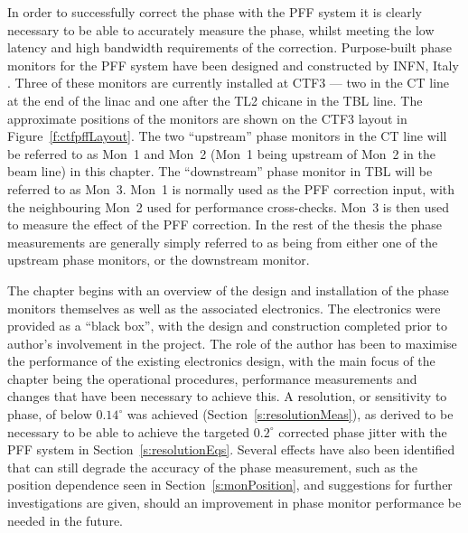 
In order to successfully correct the phase with the PFF system it is clearly necessary to be able to accurately measure the phase, whilst meeting the low latency and high bandwidth requirements of the correction. Purpose-built phase monitors for the PFF system have been designed and constructed by INFN, Italy \cite{phMonEuCard}. Three of these monitors are currently installed at CTF3 --- two in the CT line at the end of the linac and one after the TL2 chicane in the TBL line. The approximate positions of the monitors are shown on the CTF3 layout in Figure~\ref{f:ctfpffLayout}. The two ``upstream'' phase monitors in the CT line will be referred to as Mon~1 and Mon~2 (Mon~1 being upstream of Mon~2 in the beam line) in this chapter. The ``downstream'' phase monitor in TBL will be referred to as Mon~3. Mon~1 is normally used as the PFF correction input, with the neighbouring Mon~2 used for performance cross-checks. Mon~3 is then used to measure the effect of the PFF correction. In the rest of the thesis the phase measurements are generally simply referred to as being from either one of the upstream phase monitors, or the downstream monitor. 

The chapter begins with an overview of the design and installation of the phase monitors themselves as well as the associated electronics. The electronics were provided as a ``black box'', with the design and construction completed prior to author's involvement in the project.
The role of the author has been to maximise the performance of the existing electronics design, with the main focus of the chapter being the operational procedures, performance measurements and changes that have been necessary to achieve this. A resolution, or sensitivity to phase, of below \(0.14^\circ\) was achieved (Section~\ref{s:resolutionMeas}), as derived to be necessary to be able to achieve the targeted \(0.2^\circ\) corrected phase jitter with the PFF system in Section~\ref{s:resolutionEqs}. Several effects have also been identified that can still degrade the accuracy of the phase measurement, such as the position dependence seen in Section~\ref{s:monPosition}, and suggestions for further investigations are given, should an improvement in phase monitor performance be needed in the future.


